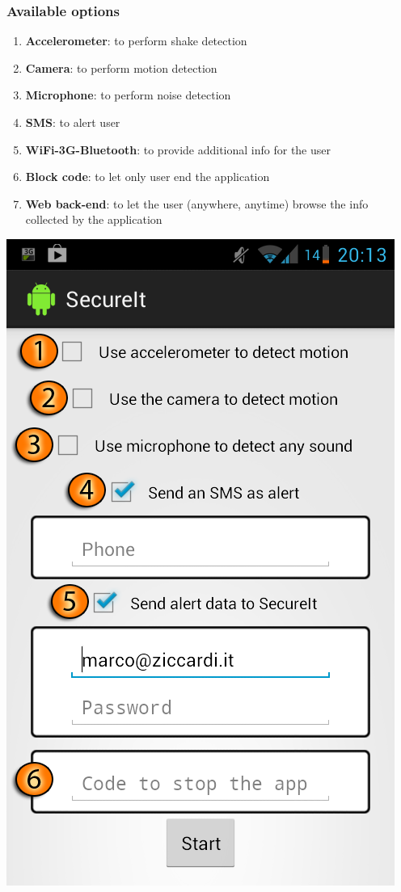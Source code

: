 \documentclass{beamer}
\begin{document}
\begin{frame}
\frametitle{Available options}
\noindent\begin{minipage}[c]{.7\textwidth}
\begin{enumerate}
  \item \textbf{Accelerometer}: to perform shake detection
  \item \textbf{Camera}: to perform motion detection
  \item \textbf{Microphone}: to perform noise detection
  \item \textbf{SMS}: to alert user
  \item \textbf{WiFi-3G-Bluetooth}: to provide additional info for the user
  \item \textbf{Block code}: to let only user end the application
  \item \textbf{Web back-end}: to let the user (anywhere, anytime) browse the info collected by the application
\end{enumerate}
\end{minipage}\begin{minipage}[c]{.25\textwidth}
\includegraphics[scale=.2]{./../ipermediali/img/firstpage.png}
\end{minipage}
\end{frame}
\end{document}
